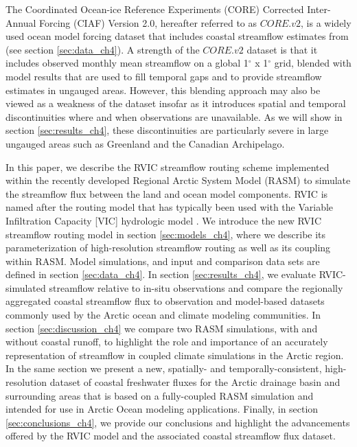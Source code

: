 The Coordinated Ocean-ice Reference Experiments (CORE) Corrected Inter-Annual Forcing (CIAF) Version 2.0, hereafter referred to as $CORE.v2$, is a widely used ocean model forcing dataset that includes coastal streamflow estimates from \citet{Dai_2009} (see section \ref{sec:data_ch4}).
A strength of the $CORE.v2$ dataset is that it includes observed monthly mean streamflow on a global 1$^{\circ}$ x 1$^{\circ}$ grid, blended with model results that are used to fill temporal gaps and to provide streamflow estimates in ungauged areas.
However, this blending approach may also be viewed as a weakness of the dataset insofar as it introduces spatial and temporal discontinuities where and when observations are unavailable.
As we will show in section \ref{sec:results_ch4}, these discontinuities are particularly severe in large ungauged areas such as Greenland and the Canadian Archipelago.

In this paper, we describe the RVIC streamflow routing scheme implemented within the recently developed Regional Arctic System Model (RASM) \citep{Roberts_2015a,DuVivier_2016,Hamman_2016a} to simulate the streamflow flux between the land and ocean model components.
RVIC is named after the routing model that has typically been used with the Variable Infiltration Capacity [VIC] hydrologic model \citep{Liang_1996}.
We introduce the new RVIC streamflow routing model in section \ref{sec:models_ch4}, where we describe its parameterization of high-resolution streamflow routing as well as its coupling within RASM.
Model simulations, and input and comparison data sets are defined in section \ref{sec:data_ch4}.
In section \ref{sec:results_ch4}, we evaluate RVIC-simulated streamflow relative to in-situ observations and compare the regionally aggregated coastal streamflow flux to observation and model-based datasets commonly used by the Arctic ocean and climate modeling communities.
In section \ref{sec:discussion_ch4} we compare two RASM simulations, with and without coastal runoff, to highlight the role and importance of an accurately representation of streamflow in coupled climate simulations in the Arctic region.
In the same section we present a new, spatially- and temporally-consistent, high-resolution dataset of coastal freshwater fluxes for the Arctic drainage basin and surrounding areas that is based on a fully-coupled RASM simulation and intended for use in Arctic Ocean modeling applications.
Finally, in section \ref{sec:conclusions_ch4}, we provide our conclusions and highlight the advancements offered by the RVIC model and the associated coastal streamflow flux dataset.


